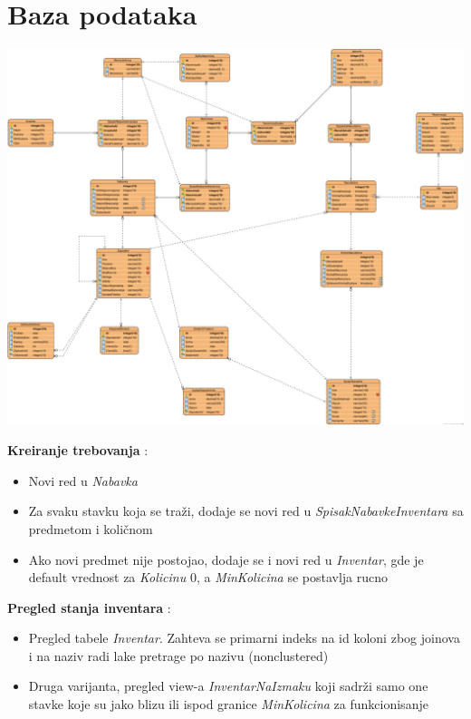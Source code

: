 \documentclass{article}
\begin{document}

\section{Baza podataka}
 \includegraphics[width=\textwidth]{NajmanjiProblem_BazaPodataka.png}
 
 
\textbf{Kreiranje trebovanja} :
\begin{itemize}
\item Novi red u \emph{Nabavka}
\item Za svaku stavku koja se traži, dodaje se novi red u \emph{SpisakNabavkeInventara} sa predmetom i količnom
\item Ako novi predmet nije postojao, dodaje se i novi red u \emph{Inventar}, gde je default vrednost za \emph{Kolicinu} 0, a \emph{MinKolicina} se postavlja rucno
\end{itemize}


\textbf{Pregled stanja inventara} :
\begin{itemize}
\item Pregled tabele \emph{Inventar}. Zahteva se primarni indeks na id koloni zbog joinova i na naziv radi lake pretrage po nazivu (nonclustered)
\item Druga varijanta, pregled view-a \emph{InventarNaIzmaku} koji sadrži samo one stavke koje su jako blizu ili ispod granice \emph{MinKolicina} za funkcionisanje
\end{itemize}
\end{document}
